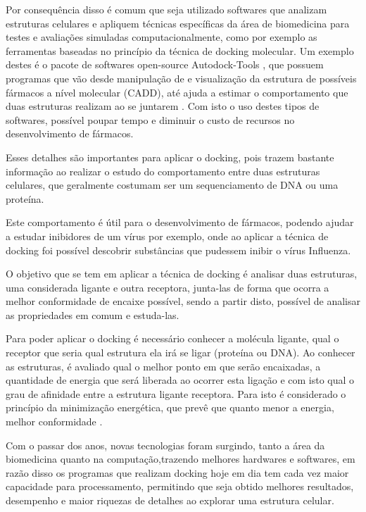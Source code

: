\documentclass[tcc, capa]{texucpel}
\begin{document}
Por consequência disso é comum que seja utilizado softwares que analizam estruturas celulares e apliquem técnicas específicas da área de biomedicina para testes e avaliações simuladas computacionalmente, como por exemplo as ferramentas baseadas no princípio da técnica de docking molecular.
Um exemplo destes é o pacote de softwares open-source Autodock-Tools \cite{autodocktools}, que possuem programas que vão desde manipulação de e visualização da estrutura de possíveis fármacos a nível molecular (CADD), até ajuda a estimar o comportamento que duas estruturas realizam ao se juntarem \cite{trott2010autodock}.
Com isto o uso destes tipos de softwares, possível poupar tempo e diminuir o custo de recursos no desenvolvimento de fármacos.

Esses detalhes são importantes para aplicar o docking, pois trazem bastante informação ao realizar o estudo do comportamento entre duas estruturas celulares, que geralmente costumam ser um sequenciamento de DNA ou uma proteína.%

Este comportamento é útil para o desenvolvimento de fármacos, podendo ajudar a estudar inibidores de um vírus por exemplo,  onde ao aplicar a técnica de docking foi possível descobrir substâncias que pudessem inibir o vírus Influenza\cite{ishikawa2011binding}.

O objetivo que se tem em aplicar a técnica de docking é analisar duas estruturas, uma considerada ligante e outra receptora, junta-las de forma que ocorra a melhor conformidade de encaixe possível, sendo a partir disto, possível de analisar as propriedades em comum e estuda-las.

Para poder aplicar o docking é necessário conhecer a molécula ligante, qual o receptor que seria qual estrutura ela irá se ligar (proteína ou DNA). Ao conhecer as estruturas, é avaliado qual o melhor ponto em que serão encaixadas, a quantidade de energia que será liberada ao ocorrer esta ligação e com isto qual o grau de afinidade entre a estrutura ligante receptora. Para isto é considerado o princípio da minimização energética, que prevê que quanto menor a energia, melhor conformidade \cite{kitchen2004docking}.

Com o passar dos anos, novas tecnologias foram surgindo, tanto a área da biomedicina quanto na computação,trazendo melhores hardwares e softwares, em razão disso os programas que realizam docking hoje em dia tem cada vez maior capacidade para processamento, permitindo que seja obtido melhores resultados, desempenho e maior riquezas de detalhes ao explorar uma estrutura celular.
\end{document}
